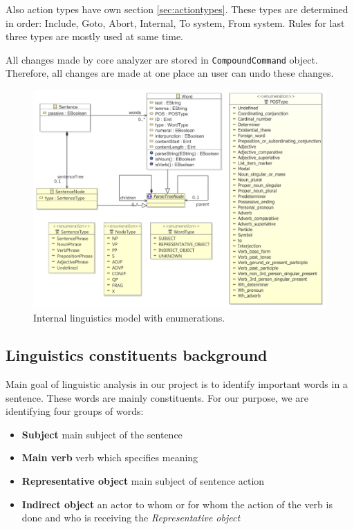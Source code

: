 Also action types have own section \ref{sec:actiontypes}. These types are determined in order: Include, Goto, Abort, Internal, To system, From system. Rules for last three types are mostly used at same time.

All changes made by core analyzer are stored in \verb|CompoundCommand| object. Therefore, all changes are made at one place an user can undo these changes.

\begin{figure}[ht]
  \centering
  \includegraphics[width=\textwidth]{images/ReprotoolLingModel}
  \caption{Internal linguistics model with enumerations.}
  \label{fig:ReprotoolLingModel}
\end{figure}

\subsection{Linguistics constituents background}
\label{sec:lingbackground}
Main goal of linguistic analysis in our project is to identify important words in a sentence. These words are mainly constituents. For our purpose, we are identifying four groups of words:

\begin{itemize}
\item {\bf Subject} main subject of the sentence
\item {\bf Main verb} verb which specifies meaning
\item {\bf Representative object} main subject of sentence action
\item {\bf Indirect object} an actor to whom or for whom the action of the verb is done and who is receiving the \emph{Representative object}
\end{itemize}

